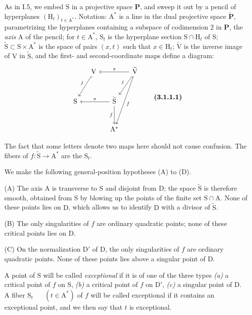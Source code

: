\documentclass[11pt,leqno]{article}
\newcommand{\Page}[1]{\ifvmode\noindent\else\unskip\ \fi{\footnotesize\textcolor{gray}{[p.\,#1]}}\ \ignorespaces}
\begin{document}
As in I.5, we embed \(\mathrm S\) in a projective space \(\mathbf P\), and sweep it out by a pencil of hyperplanes \((\mathrm H_t)_{t\in\mathrm A^*}\). Notation: \(\mathrm A^*\) is a line in the dual projective space \(\check{\mathbf P}\), parametrizing the hyperplanes containing a subspace of codimension \(2\) in \(\mathbf P\), the \textit{axis} \(\mathrm A\) of the pencil; for \(t\in\mathrm A^*\), \(\mathrm S_t\) is the hyperplane section \(\mathrm S\cap\mathrm H_t\) of \(\mathrm S\); \(\widetilde{\mathrm S}\subset\mathrm S\times\mathrm A^*\) is the space of pairs \((x,t)\) such that \(x\in\mathrm H_t\); \(\widetilde{\mathrm V}\) is the inverse image of \(\mathrm V\) in \(\widetilde{\mathrm S}\), and the first- and second-coordinate maps define a diagram:
\[
\begin{tikzcd}[ampersand replacement=\&, column sep=small, row sep=large]
\& \mathrm V \arrow[dl,hook,"j"'] \& \&
\widetilde{\mathrm V}
  \arrow[ll,"\pi"']
  \arrow[dl,hook,"j"']
  \arrow[ddl,"f"] \\
\mathrm S \& \&
\widetilde{\mathrm S}\arrow[ll,"\pi"']\arrow[d,"f"'] \& \\
\& \& \mathrm A^* \&
\end{tikzcd}
\tag*{\textbf{(3.1.1.1)}}
\]

The fact that some letters denote two maps here should not cause confusion. The fibers of \(f:\widetilde{\mathrm S}\to\mathrm A^*\) are the \(\mathrm S_t\).

We make the following general-position hypotheses (A) to (D).

(A) The axis \(\mathrm A\) is transverse to \(\mathrm S\) and disjoint from \(\mathrm D\); the space \(\widetilde{\mathrm S}\) is therefore smooth, obtained from \(\mathrm S\) by blowing up the points of the finite set \(\mathrm S\cap\mathrm A\). None of these points lies on \(\mathrm D\), which allows us to identify \(\mathrm D\) with a divisor of \(\widetilde{\mathrm S}\).

(B) The only singularities of \(f\) are ordinary quadratic points; none of these critical points lies on \(\mathrm D\).

(C) On the normalization \(\mathrm D'\) of \(\mathrm D\), the only singularities of \(f\) are ordinary quadratic points. None of these points lies above a singular point of \(\mathrm D\).

A point of \(\mathrm S\) will be called \textit{exceptional} if it is of one of the three types \textit{(a)} a critical point of \(f\) on \(\mathrm S\), \textit{(b)} a critical point of \(f\) on \(\mathrm D'\), \textit{(c)} a singular point of \(\mathrm D\). A fiber \(\mathrm S_t\)
\Page{198}
\((t\in\mathrm A^*)\) of \(f\) will be called exceptional if it contains an exceptional point, and we then say that \(t\) is exceptional.
\end{document}
